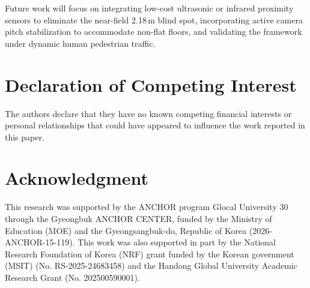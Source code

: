 \documentclass[preprint,12pt]{elsarticle}
\begin{document}
Future work will focus on integrating low-cost ultrasonic or infrared proximity sensors to eliminate the near-field 2.18\,m blind spot, incorporating active camera pitch stabilization to accommodate non-flat floors, and validating the framework under dynamic human pedestrian traffic.

\section*{Declaration of Competing Interest}
The authors declare that they have no known competing financial interests or personal relationships that could have appeared to influence the work reported in this paper.

\section*{Acknowledgment}
This research was supported by the ANCHOR program Glocal University 30 through the Gyeongbuk ANCHOR CENTER, funded by the Ministry of Education (MOE) and the Gyeongsangbuk-do, Republic of Korea (2026-ANCHOR-15-119). This work was also supported in part by the National Research Foundation of Korea (NRF) grant funded by the Korean government (MSIT) (No. RS-2025-24683458) and the Handong Global University Academic Research Grant (No. 202500590001).



\end{document}
